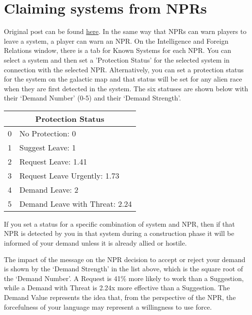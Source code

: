 \documentclass[../Aurora C# unofficial manual.tex]{subfiles}
\begin{document}
	\section{Claiming systems from NPRs}\label{3_claiming_npr_systems}
	Original post can be found
	\href{http://aurora2.pentarch.org/index.php?topic=8495.msg118362#msg118362}{here}.
	\newline\newline
	In the same way that NPRs can warn players to leave a system, a player can warn an NPR. On the Intelligence and Foreign Relations window, there is a tab for Known Systems for each NPR. You can select a system and then set a 'Protection Status' for the selected system in connection with the selected NPR. Alternatively, you can set a protection status for the system on the galactic map and that status will be set for any alien race when they are first detected in the system. The six statuses are shown below with their ‘Demand Number’ (0-5) and their ‘Demand Strength’.
	
	\begin{center}
		\begin{tabular}{|l|l|}
			\hline
			\multicolumn{2}{|c|}{\textbf{Protection Status}} \\
			\hline
			0 & No Protection: 0 \\
			\hline
			1 & Suggest Leave: 1 \\
			\hline
			2 & Request Leave: 1.41 \\
			\hline
			3 & Request Leave Urgently: 1.73 \\
			\hline
			4 & Demand Leave: 2 \\
			\hline
			5 & Demand Leave with Threat: 2.24 \\
			\hline
		\end{tabular}
	\end{center}
	
	
	If you set a status for a specific combination of system and NPR, then if that NPR is detected by you in that system during a construction phase it will be informed of your demand unless it is already allied or hostile.
	
	The impact of the message on the NPR decision to accept or reject your demand is shown by the ‘Demand Strength’ in the list above, which is the square root of the ‘Demand Number’. A Request is 41\% more likely to work than a Suggestion, while a Demand with Threat is 2.24x more effective than a Suggestion. The Demand Value represents the idea that, from the perspective of the NPR, the forcefulness of your language may represent a willingness to use force.
	
\end{document}
